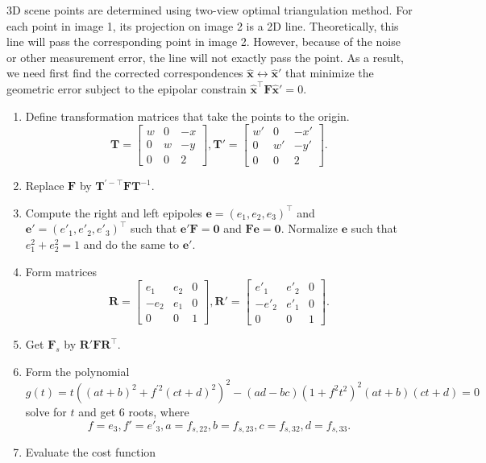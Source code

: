\documentclass{../../assignment}
\begin{document}
\begin{problemlist}
\begin{enumerate}
3D scene points are determined using two-view optimal triangulation method. For each point in image 1, its projection on image 2 is a 2D line. Theoretically, this line will pass the corresponding point in image 2. However, because of the noise or other measurement error, the line will not exactly pass the point. As a result, we need first find the corrected correspondences $\hat{\mathbf{x}}\leftrightarrow \hat{\mathbf{x}}'$ that minimize the geometric error subject to the epipolar constrain $\hat{\mathbf{x}}^{\top}\mathbf{F} \hat{\mathbf{x}}' = 0$.
\begin{enumerate}
\item Define transformation matrices that take the points to the origin.
$$
\mathbf{T}=
\begin{bmatrix}
w & 0 & -x\\
0 & w & -y\\
0 & 0 & 2
\end{bmatrix},
\mathbf{T}'=
\begin{bmatrix}
w' & 0 & -x'\\
0 & w' & -y'\\
0 & 0 & 2
\end{bmatrix}.
$$
\item Replace $\mathbf{F}$ by $\mathbf{T}^{'-\top}\mathbf{FT}^{-1}$.
\item Compute the right and left epipoles $\mathbf{e} = (e_1,e_2,e_3)^{\top}$ and $\mathbf{e}' = (e'_1,e'_2,e'_3)^{\top}$ such that $\mathbf{e}'\mathbf{F} = \mathbf{0}$ and $\mathbf{Fe} = \mathbf{0}$. Normalize $\mathbf{e}$ such that $e_1^2 + e_2^2 = 1$ and do the same to $\mathbf{e}'$.
\item Form matrices
$$
\mathbf{R}=
\begin{bmatrix}
e_1 & e_2 & 0\\
-e_2 & e_1 & 0\\
0 & 0 & 1
\end{bmatrix},
\mathbf{R}'=
\begin{bmatrix}
e'_1 & e'_2 & 0\\
-e'_2 & e'_1 & 0\\
0 & 0 & 1
\end{bmatrix}.
$$
\item Get $\mathbf{F}_s$ by $\mathbf{R}'\mathbf{FR}^{\top}$.
\item Form the polynomial
$$
g(t) = t((at+b)^2 + f^{'2}(ct+d)^2)^2-(ad-bc)(1+f^2t^2)^2(at+b)(ct+d) = 0
$$
solve for $t$ and get 6 roots, where
$$
f = e_3, f' = e'_3, a = f_{s,22}, b = f_{s,23}, c = f_{s,32}, d  = f_{s,33}.
$$
\item Evaluate the cost function

\end{enumerate}
\end{enumerate}
\end{problemlist}
\end{document}
